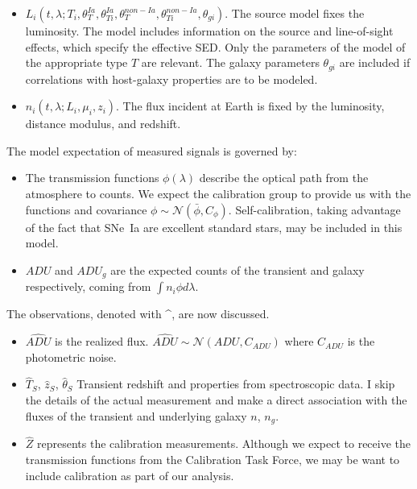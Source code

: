 \documentclass[preprint]{aastex}
\begin{document}
\begin{itemize}
\item $L_i(t,\lambda; T_i, \theta_T^{Ia}, \theta_{Ti}^{Ia}, \theta_T^{non-Ia}, \theta_{Ti}^{non-Ia},
\theta_{gi})$.  The source model fixes
the luminosity. The  model includes  information on the
source and line-of-sight effects, which specify the effective SED.   Only the
parameters of the model of the appropriate type $T$ are relevant.  The galaxy parameters
$\theta_{gi}$ are included if correlations with host-galaxy properties are to be modeled.
\item $n_i(t,\lambda; L_i, \mu_i, z_i)$.  The  flux incident at Earth
is fixed by the luminosity, distance modulus, and redshift.
\end{itemize}

The model expectation of measured  signals is governed by:
\begin{itemize}
\item The transmission functions $\phi(\lambda)$ describe the optical path from the
atmosphere to counts.  We expect
the calibration group to provide us with the functions and covariance
$\phi \sim \mathcal{N}(\bar{\phi},C_\phi)$. Self-calibration, taking advantage of the
fact that SNe~Ia are excellent standard stars, 
may be included in this model.
\item $\mathit{ADU}$ and
$\mathit{ADU}_g$ are the expected counts of the transient and galaxy respectively,
coming from $\int n_i \phi d\lambda$.
\end{itemize}

The observations, denoted with \textasciicircum, are now discussed.
\begin{itemize}
\item $\hat{\mathit{ADU}}$ is the realized flux.  $\hat{\mathit{ADU}} \sim \mathcal{N}(ADU,C_{ADU})$
where $C_{ADU}$ is the photometric noise.
\item $\hat{T}_S$, $\hat{z}_S$, $\hat{\theta}_S$ Transient redshift and properties from
spectroscopic data. I skip the details of the actual measurement  and make a direct association
with the fluxes of the transient and underlying galaxy $n$, $n_g$.
\item $\hat{Z}$ represents the calibration measurements.  Although we expect to receive
the transmission functions from the Calibration Task Force, we may be want to include
calibration as part of our analysis.
\end{itemize}
\end{document}
